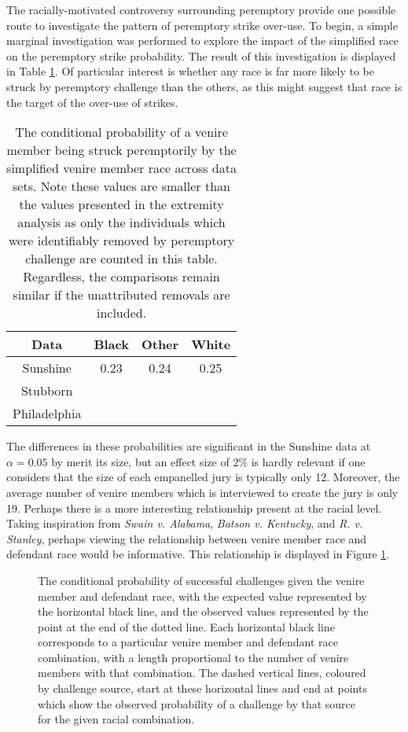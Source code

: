 The racially-motivated controversy surrounding peremptory provide one possible route to investigate the pattern of peremptory
strike over-use. To begin, a simple marginal investigation was performed to explore the impact of the simplified race on the
peremptory strike probability. The result of this investigation is displayed in Table \ref{tab:margrace}. Of particular interest
is whether any race is far more likely to be struck by peremptory challenge than the others, as this might suggest that race is
the target of the over-use of strikes.

\begin{table}
  \label{tab:margrace}
  \centering
  \caption[Strike Rate by Race]{The conditional probability of a venire member being struck peremptorily by the simplified venire
    member race across data sets. Note these values are smaller than the values presented in the extremity analysis as only the
    individuals which were identifiably removed by peremptory challenge are counted in this table. Regardless, the comparisons
    remain similar if the unattributed removals are included.}
  \begin{tabular}{|c|c|c|c|} \hline
    Data & Black & Other & White \\ \hline
    Sunshine & 0.23 & 0.24 & 0.25 \\ 
    Stubborn &  & & \\ 
    Philadelphia & & & \\ \hline
  \end{tabular}
\end{table}

The differences in these probabilities are significant in the Sunshine data at $\alpha = 0.05$ by merit its size, but an effect
size of 2\% is hardly relevant if one considers that the size of each empanelled jury is typically only 12. Moreover, the average
number of venire members which is interviewed to create the jury is only 19. Perhaps there is a more interesting relationship
present at the racial level. Taking inspiration from \textit{Swain v. Alabama}, \textit{Batson v. Kentucky}, and
\textit{R. v. Stanley}, perhaps viewing the relationship between venire member race and defendant race would be informative. This
relationship is displayed in Figure \ref{fig:racedefmob}.

\begin{figure}[!h]
  \centering
  \caption[The ``Mobile Plot'' of Racial Combination and Strikes]{The conditional probability of successful challenges given the
    venire member and defendant race, with the expected value represented by the horizontal black line, and the observed values
    represented by the point at the end of the dotted line. Each horizontal black line corresponds to a particular venire member
    and defendant race combination, with a length proportional to the number of venire members with that combination. The dashed
    vertical lines, coloured by challenge source, start at these horizontal lines and end at points which show the observed
    probability of a challenge by that source for the given racial combination.}
  \label{fig:racedefmob}
\end{figure}

